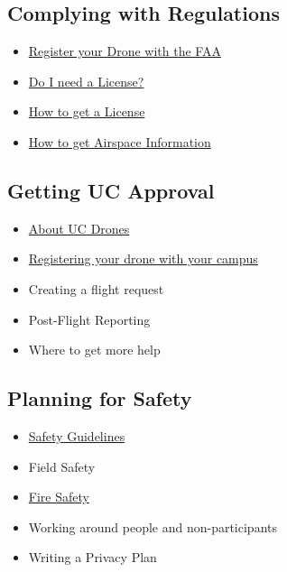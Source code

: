 \documentclass[
]{book}
\providecommand{\tightlist}{%
  \setlength{\itemsep}{0pt}\setlength{\parskip}{0pt}}
\begin{document}
\hypertarget{complying-with-regulations}{%
\subsection*{Complying with Regulations}\label{complying-with-regulations}}

\begin{itemize}
\tightlist
\item
  \protect\hyperlink{ch-register}{Register your Drone with the FAA}
\item
  \protect\hyperlink{ch-license}{Do I need a License?}
\item
  \protect\hyperlink{ch-get-license}{How to get a License}
\item
  \protect\hyperlink{ch-airspace-info}{How to get Airspace Information}
\end{itemize}

\hypertarget{getting-uc-approval}{%
\subsection*{Getting UC Approval}\label{getting-uc-approval}}

\begin{itemize}
\tightlist
\item
  \protect\hyperlink{ch-about-UCdrones}{About UC Drones}
\item
  \protect\hyperlink{ch-add-drone}{Registering your drone with your campus}
\item
  Creating a flight request
\item
  Post-Flight Reporting
\item
  Where to get more help
\end{itemize}

\hypertarget{planning-for-safety}{%
\subsection*{Planning for Safety}\label{planning-for-safety}}

\begin{itemize}
\tightlist
\item
  \protect\hyperlink{ch-safety-guidelines}{Safety Guidelines}
\item
  Field Safety
\item
  \protect\hyperlink{ch-fire-safety}{Fire Safety}
\item
  Working around people and non-participants
\item
  Writing a Privacy Plan
\end{itemize}
\end{document}
